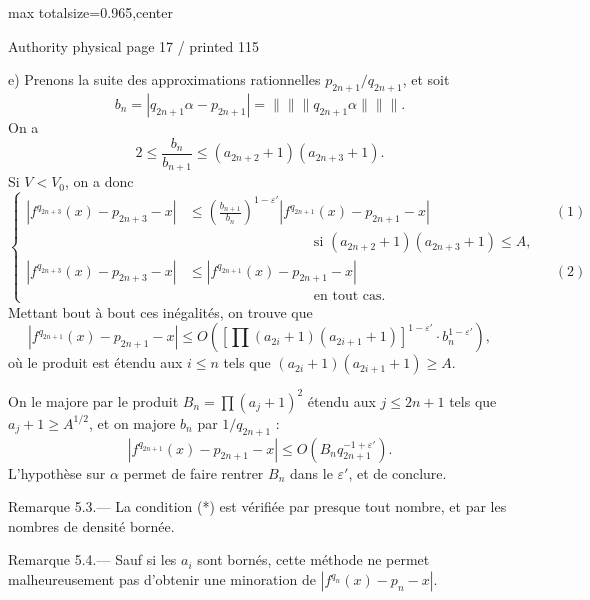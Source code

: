 \documentclass{article}
\begin{document}
\newpage
\noindent\begin{adjustbox}{max totalsize={\textwidth}{0.965\textheight},center}\begin{minipage}{\textwidth}
\noindent\hfill\scriptsize Authority physical page 17 / printed 115\par\normalsize
e) Prenons la suite des approximations rationnelles \(p_{2n+1}/q_{2n+1}\), et soit
\[
b_n=|q_{2n+1}\alpha-p_{2n+1}|=
\lVert\!\lVert\!\lVert q_{2n+1}\alpha\rVert\!\rVert\!\rVert.
\]
On a
\[
2\leq\frac{b_n}{b_{n+1}}\leq(a_{2n+2}+1)(a_{2n+3}+1).
\]
Si \(V<V_0\), on a donc
\[
\left\{
\begin{aligned}
\left|f^{q_{2n+3}}(x)-p_{2n+3}-x\right|
&\leq\left(\frac{b_{n+1}}{b_n}\right)^{1-\varepsilon'}
\left|f^{q_{2n+1}}(x)-p_{2n+1}-x\right| && (1)\\[-1mm]
&\hspace{9em}\text{si }(a_{2n+2}+1)(a_{2n+3}+1)\leq A,\\[1mm]
\left|f^{q_{2n+3}}(x)-p_{2n+3}-x\right|
&\leq\left|f^{q_{2n+1}}(x)-p_{2n+1}-x\right| && (2)\\[-1mm]
&\hspace{9em}\text{en tout cas.}
\end{aligned}
\right.
\]
Mettant bout à bout ces inégalités, on trouve que
\[
\left|f^{q_{2n+1}}(x)-p_{2n+1}-x\right|
\leq O\!\left(
\left[\prod (a_{2i}+1)(a_{2i+1}+1)\right]^{1-\varepsilon'}
\cdot b_n^{1-\varepsilon'}\right),
\]
où le produit est étendu aux \(i\leq n\) tels que \((a_{2i}+1)(a_{2i+1}+1)\geq A\).

On le majore par le produit \(B_n=\prod(a_j+1)^2\) étendu aux \(j\leq2n+1\) tels que \(a_j+1\geq A^{1/2}\), et on majore \(b_n\) par \(1/q_{2n+1}\) :
\[
\left|f^{q_{2n+1}}(x)-p_{2n+1}-x\right|
\leq O\!\left(B_nq_{2n+1}^{-1+\varepsilon'}\right).
\]
L’hypothèse sur \(\alpha\) permet de faire rentrer \(B_n\) dans le \(\varepsilon'\), et de conclure.

Remarque 5.3.— La condition (*) est vérifiée par presque tout nombre, et par les nombres de densité bornée.

Remarque 5.4.— Sauf si les \(a_i\) sont bornés, cette méthode ne permet malheureusement pas d’obtenir une minoration de \(\left|f^{q_n}(x)-p_n-x\right|\).
\end{minipage}\end{adjustbox}
\end{document}
